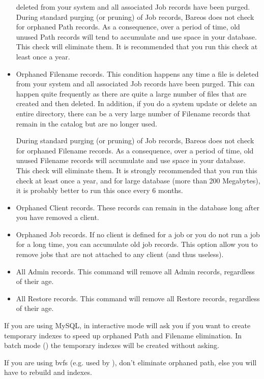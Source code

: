\begin{itemize}
   deleted from your system and all associated Job records have been purged.
   During standard purging (or pruning) of Job records, Bareos does  not check
   for orphaned Path records. As a consequence, over a period  of time, old
   unused Path records will tend to accumulate and use  space in your database.
   This check will eliminate them. It is recommended that you run this
   check at least once a year.
\item Orphaned Filename records. This condition happens any time a file is
   deleted from your system and all associated Job records have been purged.
   This can happen quite frequently as there are quite a large number  of files
   that are created and then deleted. In addition, if you  do a system update or
   delete an entire directory, there can be  a very large number of Filename
   records that remain in the catalog  but are no longer used.

   During standard purging (or pruning) of Job records, Bareos does  not check
   for orphaned Filename records. As a consequence, over a period  of time, old
   unused Filename records will accumulate and use  space in your database. This
   check will eliminate them. It is strongly  recommended that you run this check
   at least once a year, and for  large database (more than 200 Megabytes), it is
   probably better to  run this once every 6 months.
\item Orphaned Client records. These records can remain in the database  long
   after you have removed a client.
\item Orphaned Job records. If no client is defined for a job or you  do not
   run a job for a long time, you can accumulate old job  records. This option
   allow you to remove jobs that are not  attached to any client (and thus
   useless).
\item All Admin records. This command will remove all Admin records,
   regardless of their age.
\item All Restore records. This command will remove all Restore records,
   regardless of their age.
\end{itemize}


If you are using MySQL,  in interactive mode will ask you if
you want to create temporary indexes to speed up orphaned Path and Filename elimination.
In batch mode () the temporary indexes will be created without asking.

If you are using bvfs (e.g. used by ),
don't eliminate orphaned path, else you will
have to rebuild  and
 indexes.

